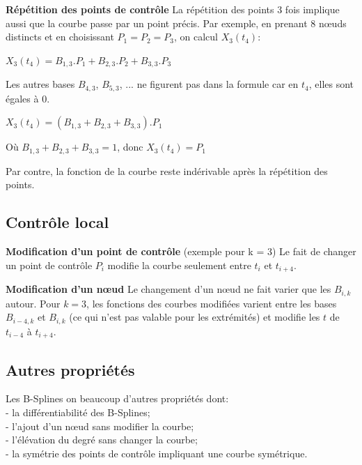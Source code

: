 \documentclass{article}
\begin{document}
\textbf{R\'{e}p\'{e}tition des points de contr\^ole }
La r\'{e}p\'{e}tition des points 3 fois implique aussi que la courbe passe par un point pr\'{e}cis.
Par exemple, en prenant $8$ n\oe uds distincts et en choisissant $P_{1} = P_{2} = P_{3}$, on calcul $X_{3}(t_{4})$:

\begin{center}$X_{3}(t_{4}) = B_{1,3}.P_{1} + B_{2,3}.P_{2} + B_{3,3}.P_{3} $
\end{center}

Les autres bases $B_{4,3}$, $B_{5,3}$, ... ne figurent pas dans la formule car en $t_{4}$, elles sont \'{e}gales \`a $0$. 

\begin{center}$X_{3}(t_{4}) = ( B_{1,3} + B_{2,3} + B_{3,3}).P_{1} $
\end{center}

O\`u $B_{1,3} + B_{2,3} + B_{3,3} = 1$, donc $X_{3}(t_{4}) = P_{1}$

Par contre, la fonction de la courbe reste ind\'{e}rivable apr\`{e}s la r\'{e}p\'{e}tition des points.

\subsection{Contr\^ole local}
\textbf{Modification d'un point de contr\^ole }
(exemple pour k = 3) Le fait de changer un point de contr\^ole  $P_{i}$ modifie la courbe seulement entre $t_{i}$ et $t_{i+4}$.

\textbf{Modification d'un n\oe ud}
Le changement d'un n\oe ud ne fait varier que les $B_{i,k}$ autour. Pour $k = 3$, les fonctions des courbes modifi\'{e}es varient entre les bases $B_{i-4,k}$ et $B_{i,k}$ (ce qui n'est pas valable pour les extr\'{e}mit\'{e}s) et modifie les $t$ de $t_{i-4} $ \`a $t_{i+4} $.


\subsection{Autres propri\'et\'es}
Les B-Splines on beaucoup d'autres propri\'{e}t\'{e}s dont:
\\- la diff\'{e}rentiabilit\'{e} des B-Splines;
\\- l'ajout d'un n\oe ud sans modifier la courbe;
\\- l'\'{e}l\'{e}vation du degr\'{e} sans changer la courbe;
\\- la sym\'{e}trie des points de contr\^ole impliquant une courbe sym\'{e}trique.
\end{document}
